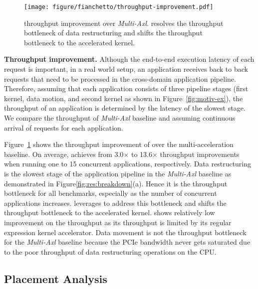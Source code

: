 \begin{figure}[t!]
    \centering
    \texttt{[image: figure/fianchetto/throughput-improvement.pdf]}
    \caption{\dmx throughput improvement over \emph{Multi-Axl}. \dmx resolves the throughput bottleneck of data restructuring and shifts the throughput bottleneck to the accelerated kernel.}
    \label{fig:res:throughput}
\end{figure}

\noindent \textbf{Throughput improvement.}
Although the end-to-end execution latency of each request is important, in a real world setup, an application receives back to back requests that need to be processed in the cross-domain application pipeline. Therefore, assuming that each application consists of three pipeline stages (first kernel, data motion, and second kernel as shown in Figure~\ref{fig:motiv-ex}), the throughput of an application is determined by the latency of the slowest stage. We compare the throughput of \emph{Multi-Axl} baseline and \dmx assuming continuous arrival of requests for each application. 

%
Figure~\ref{fig:res:throughput} shows the throughput improvement of \dmx over the multi-acceleration baseline.
%
On average, \dmx achieves from 3.0$\times$ to 13.6$\times$ throughput improvements when running one to 15 concurrent applications, respectively. 
%
Data restructuring is the slowest stage of the application pipeline in the \emph{Multi-Axl} baseline as demonstrated in Figure\ref{fig:res:breakdown}(a).
%
Hence it is the throughput bottleneck for all benchmarks, especially as the number of concurrent applications increases.
%
\dmx leverages \drx to address this bottleneck and shifts the throughput bottleneck to the accelerated kernel.
%
\pir shows relatively low improvement on the throughput as its throughput is limited by its regular expression kernel accelerator.
%
Data movement is not the throughput bottleneck for the \emph{Multi-Axl} baseline because the PCIe bandwidth never gets saturated due to the poor throughput of data restructuring operations on the CPU.

\subsection{\drx Placement Analysis}
\label{sec:results:placement}

